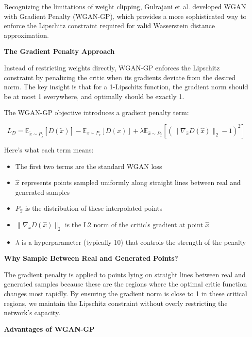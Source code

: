 Recognizing the limitations of weight clipping, Gulrajani et al. \cite{gulrajani2017improved} developed WGAN with Gradient Penalty (WGAN-GP), which provides a more sophisticated way to enforce the Lipschitz constraint required for valid Wasserstein distance approximation.

\textbf{The Gradient Penalty Approach}

Instead of restricting weights directly, WGAN-GP enforces the Lipschitz constraint by penalizing the critic when its gradients deviate from the desired norm. The key insight is that for a 1-Lipschitz function, the gradient norm should be at most 1 everywhere, and optimally should be exactly 1.

The WGAN-GP objective introduces a gradient penalty term:

\begin{equation}
L_D = \mathbb{E}_{\tilde{x} \sim P_g}[D(\tilde{x})] - \mathbb{E}_{x \sim P_r}[D(x)] + \lambda \mathbb{E}_{\hat{x} \sim P_{\hat{x}}}[(\|\nabla_{\hat{x}} D(\hat{x})\|_2 - 1)^2]
\end{equation}

Here's what each term means:
\begin{itemize}
    \item The first two terms are the standard WGAN loss
    \item $\hat{x}$ represents points sampled uniformly along straight lines between real and generated samples
    \item $P_{\hat{x}}$ is the distribution of these interpolated points
    \item $\|\nabla_{\hat{x}} D(\hat{x})\|_2$ is the L2 norm of the critic's gradient at point $\hat{x}$
    \item $\lambda$ is a hyperparameter (typically 10) that controls the strength of the penalty
\end{itemize}

\textbf{Why Sample Between Real and Generated Points?}

The gradient penalty is applied to points lying on straight lines between real and generated samples because these are the regions where the optimal critic function changes most rapidly. By ensuring the gradient norm is close to 1 in these critical regions, we maintain the Lipschitz constraint without overly restricting the network's capacity.

\textbf{Advantages of WGAN-GP}

